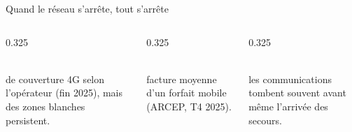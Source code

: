 \begin{frame}{Quand le réseau s'arrête, tout s'arrête}
  \vspace{0.2cm}
  \begin{columns}[T]
    \begin{column}{0.325\textwidth}
      \begin{carte}
        \\[1pt]
        {\footnotesize de couverture 4G selon l'opérateur (fin 2025), mais des zones blanches persistent.}
      \end{carte}
    \end{column}
    \begin{column}{0.325\textwidth}
      \begin{carte}
        \\[1pt]
        {\footnotesize facture moyenne d'un forfait mobile (ARCEP, T4 2025).}
      \end{carte}
    \end{column}
    \begin{column}{0.325\textwidth}
      \begin{carte}
        \\[1pt]
        {\footnotesize les communications tombent souvent avant même l'arrivée des secours.}
      \end{carte}
    \end{column}
  \end{columns}
\end{frame}

